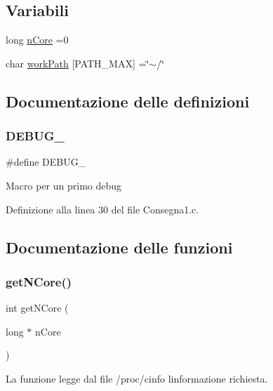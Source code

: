 \subsection*{Variabili}
\begin{DoxyCompactItemize}
\item 
long \mbox{\hyperlink{a00008_aa458de5166b611b8c2c9c8e7a4a87d87}{n\+Core}} =0
\item 
char \mbox{\hyperlink{a00008_a0e6ffcfac15a20d9a6157dd0fd804d28}{work\+Path}} \mbox{[}P\+A\+T\+H\+\_\+\+M\+AX\mbox{]} =\char`\"{}$\sim$/\char`\"{}
\end{DoxyCompactItemize}


\subsection{Documentazione delle definizioni}
\mbox{\label{a00008_aedac27103da1d7cbeb79d62837ce00d1}} 
\subsubsection{\texorpdfstring{DEBUG\_}{DEBUG\_}}
{\footnotesize\ttfamily \#define D\+E\+B\+U\+G\+\_\+}

Macro per un primo debug 

Definizione alla linea 30 del file Consegna1.\+c.



\subsection{Documentazione delle funzioni}
\mbox{\label{a00008_a45da120f57baa2bfd2da67be556dfa8a}} 
\subsubsection{\texorpdfstring{getNCore()}{getNCore()}}
{\footnotesize\ttfamily int get\+N\+Core (\begin{DoxyParamCaption}\item[{long $\ast$}]{n\+Core }\end{DoxyParamCaption})}



La funzione legge dal file /proc/cinfo l\textquotesingle{}informazione richiesta. 


